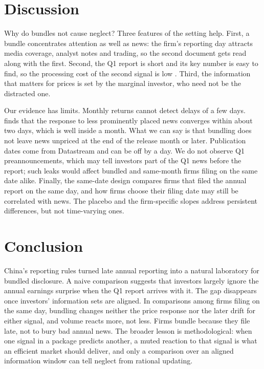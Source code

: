 \documentclass[11pt]{article}
\begin{document}
\section{Discussion}

Why do bundles not cause neglect? Three features of the setting help. First, a bundle concentrates attention as well
as news: the firm's reporting day attracts media coverage, analyst notes and trading, so the second document gets
read along with the first. Second, the Q1 report is short and its key number is easy to find, so the processing cost
of the second signal is low \citep{blankespoor2020}. Third, the information that matters for prices is set by the
marginal investor, who need not be the distracted one.

Our evidence has limits. Monthly returns cannot detect delays of a few days. \citet{fedyk2024} finds that the
response to less prominently placed news converges within about two days, which is well inside a month. What we can
say is that bundling does not leave news unpriced at the end of the release month or later. Publication dates come
from Datastream and can be off by a day. We do not observe Q1 preannouncements, which may tell investors part of the
Q1 news before the report; such leaks would affect bundled and same-month firms filing on the same date alike.
Finally, the same-date design compares firms that filed the annual report on the same day, and how firms choose
their filing date may still be correlated with news. The placebo and the firm-specific slopes address persistent
differences, but not time-varying ones.

\section{Conclusion}

China's reporting rules turned late annual reporting into a natural laboratory for bundled disclosure. A naive
comparison suggests that investors largely ignore the annual earnings surprise when the Q1 report arrives with it.
The gap disappears once investors' information sets are aligned. In comparisons among firms filing on the same day,
bundling changes neither the price response nor the later drift for either signal, and volume reacts more, not less.
Firms bundle because they file late, not to bury bad annual news. The broader lesson is methodological: when one
signal in a package predicts another, a muted reaction to that signal is what an efficient market should deliver,
and only a comparison over an aligned information window can tell neglect from rational updating.
\end{document}

